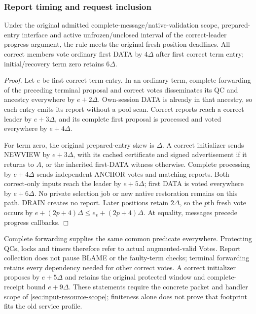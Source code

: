 \subsubsection{Report timing and request inclusion}
\label{sec:input-report-progress}
\begin{proposition}
\label{prop:v38-report-timing}
\label{prop:v310-report-timing}
Under the original admitted complete-message/native-validation scope,
prepared-entry interface and active unfrozen/unclosed interval of the
correct-leader progress argument, the rule meets the original fresh
position deadlines. All correct members vote ordinary first DATA by
$4\Delta$ after first correct term entry; initial/recovery term zero
retains $6\Delta$.
\end{proposition}
\begin{proof}
Let $e$ be first correct term entry. In an ordinary term, complete
forwarding of the preceding terminal proposal and correct votes
disseminates its QC and ancestry everywhere by $e+2\Delta$.
Own-session DATA is already in that ancestry, so each entry emits its
 report without a pool scan. Correct reports reach a
correct leader by $e+3\Delta$, and its complete first proposal is
processed and voted everywhere by $e+4\Delta$.

For term zero, the original prepared-entry skew is $\Delta$.
A correct initializer sends NEWVIEW by $e+3\Delta$, with its cached
certificate and signed advertisement if it returns to $A$, or the
inherited first-DATA witness otherwise. Complete processing by
$e+4\Delta$ sends independent ANCHOR votes and matching reports.
Both correct-only inputs reach the leader by $e+5\Delta$; first DATA
is voted everywhere by $e+6\Delta$. No private selection job or new
native restoration remains on this path. DRAIN creates no report.
Later positions retain $2\Delta$, so the $p$th fresh vote occurs by
$e+(2p+4)\Delta\le e_v+(2p+4)\Delta$. At equality, messages precede
progress callbacks.
\end{proof}

Complete forwarding supplies the same common predicate everywhere.
Protecting QCs, locks and timers therefore refer to actual
augmented-valid Votes. Report collection does not pause BLAME or the
faulty-term checks; terminal forwarding retains every dependency needed
for other correct votes. A correct initializer proposes by $e+5\Delta$
and retains the original protected window and complete-receipt bound
$e+9\Delta$. These statements require the concrete packet and handler
scope of \cref{sec:input-resource-scope}; finiteness alone does not prove
that footprint fits the old service profile.

